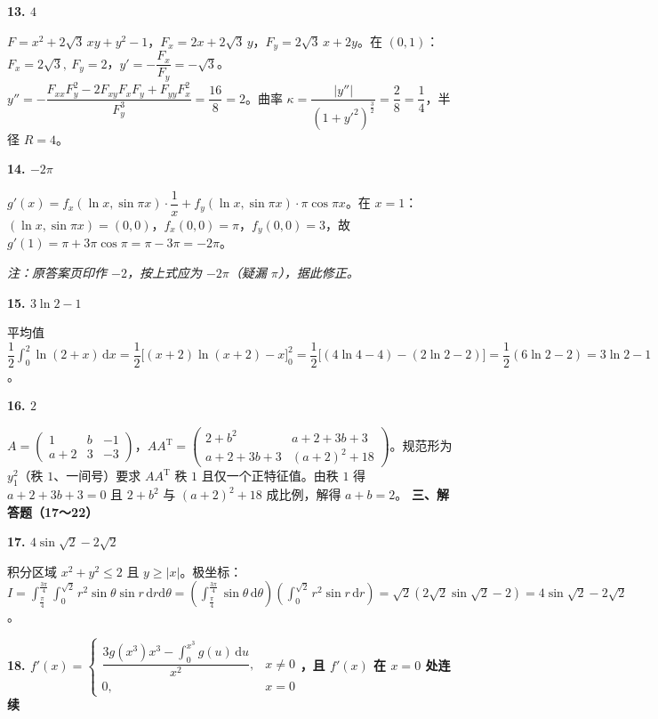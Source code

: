 \documentclass[UTF8,11pt]{ctexart}
\begin{document}
\par\noindent\textbf{13. $4$}\par
$F=x^2+2\sqrt3\,xy+y^2-1$，$F_x=2x+2\sqrt3\,y$，$F_y=2\sqrt3\,x+2y$。在 $(0,1)$：$F_x=2\sqrt3,\ F_y=2$，$y'=-\dfrac{F_x}{F_y}=-\sqrt3$。$y''=-\dfrac{F_{xx}F_y^2-2F_{xy}F_xF_y+F_{yy}F_x^2}{F_y^3}=\dfrac{16}{8}=2$。曲率 $\kappa=\dfrac{|y''|}{(1+y'^2)^{\frac32}}=\dfrac{2}{8}=\dfrac14$，半径 $R=4$。
\par\noindent\textbf{14. $-2\pi$}\par
$g'(x)=f_x(\ln x,\sin\pi x)\cdot\dfrac1x+f_y(\ln x,\sin\pi x)\cdot\pi\cos\pi x$。在 $x=1$：$(\ln x,\sin\pi x)=(0,0)$，$f_x(0,0)=\pi$，$f_y(0,0)=3$，故 $g'(1)=\pi+3\pi\cos\pi=\pi-3\pi=-2\pi$。
\par\small\color{gray}\emph{注：原答案页印作 $-2$，按上式应为 $-2\pi$（疑漏 $\pi$），据此修正。}\par
\par\noindent\textbf{15. $3\ln2-1$}\par
平均值 $\dfrac12\int_0^2\ln(2+x)\,\mathrm{d}x=\dfrac12\big[(x+2)\ln(x+2)-x\big]_0^2=\dfrac12\big[(4\ln4-4)-(2\ln2-2)\big]=\dfrac12(6\ln2-2)=3\ln2-1$。
\par\noindent\textbf{16. $2$}\par
$A=\begin{pmatrix}1&b&-1\\a+2&3&-3\end{pmatrix}$，$AA^{\mathrm{T}}=\begin{pmatrix}2+b^2&a+2+3b+3\\a+2+3b+3&(a+2)^2+18\end{pmatrix}$。规范形为 $y_1^2$（秩 $1$、一间号）要求 $AA^{\mathrm{T}}$ 秩 $1$ 且仅一个正特征值。由秩 $1$ 得 $a+2+3b+3=0$ 且 $2+b^2$ 与 $(a+2)^2+18$ 成比例，解得 $a+b=2$。
{\Large\bfseries 三、解答题（17～22）}\par\vspace{4pt}
\par\noindent\textbf{17. $4\sin\sqrt2-2\sqrt2$}\par
积分区域 $x^2+y^2\leqslant2$ 且 $y\geqslant|x|$。极坐标：$I=\displaystyle\int_{\frac\pi4}^{\frac{3\pi}4}\!\int_0^{\sqrt2}r^2\sin\theta\sin r\,\mathrm{d}r\mathrm{d}\theta=\left(\int_{\frac\pi4}^{\frac{3\pi}4}\sin\theta\,\mathrm{d}\theta\right)\left(\int_0^{\sqrt2}r^2\sin r\,\mathrm{d}r\right)=\sqrt2\left(2\sqrt2\sin\sqrt2-2\right)=4\sin\sqrt2-2\sqrt2$。
\par\noindent\textbf{18. $f'(x)=\begin{cases}\dfrac{3g(x^3)x^3-\int_0^{x^3}g(u)\,\mathrm{d}u}{x^2},&x\neq0\\ 0,&x=0\end{cases}$，且 $f'(x)$ 在 $x=0$ 处连续}\par
\end{document}
